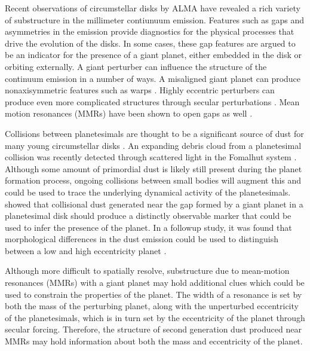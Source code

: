 \documentclass[twocolumn]{aastex63}
\begin{document}
Recent observations of circumstellar disks by ALMA have revealed a rich variety of substructure in the millimeter contiunuum emission. Features 
such as gaps and asymmetries 
\citep{2015ApJ...808L...3A, 2016Sci...353.1519P, PhysRevLett.117.251101, 2016ApJ...820L..40A, 2016Natur.535..258C} in the emission provide 
diagnostics for the physical processes that drive the evolution of the disks. In some cases, these gap features are argued to be an indicator for the 
presence of a giant planet, either embedded in the disk \citep{2015MNRAS.453L..73D} or orbiting externally. A giant perturber can influence the 
structure of the continuum emission in a number of ways. A misaligned giant planet can produce nonaxisymmetric features such as warps 
\citep{2001A&A...370..447A}. Highly eccentric perturbers can produce even more complicated structures through secular perturbations 
\citep{2014MNRAS.443.2541P, 2015MNRAS.448.3679P}. Mean motion resonances (MMRs) have been shown to open gaps as well 
\citep{2015ApJ...798...83N, 2016ApJ...818..159T, 2018ApJ...857....3T}.

Collisions between planetesimals are thought to be a significant source of dust for many young circumstellar disks 
\citep[see][]{2008ARA&A..46..339W}. An expanding debris cloud from a planetesimal collision was recently detected through scattered light in the 
Fomalhut system \citep{2020PNAS..117.9712G}. Although some amount of primordial dust is likely still present during the planet formation process, 
ongoing collisions between small bodies will augment this and could be used to trace the underlying dynamical activity of the planetesimals. 
\citet{2013ApJ...777L..31D} showed that collisional dust generated near the gap formed by a giant planet in a planetesimal disk should produce a 
distinctly observable marker that could be used to infer the presence of the planet. In a followup study, it was found that morphological differences in 
the dust emission could be used to distinguish between a low and high eccentricity planet \citep{2016ApJ...820...29D}.

Although more difficult to spatially resolve, substructure due to mean-motion resonances (MMRs) with a giant planet may hold additional clues which 
could be used to constrain the properties of the planet.  The width of a resonance is set by both the mass of the perturbing planet, along with the 
unperturbed eccentricity of the planetesimals, which is in turn set by the eccentricity of the planet through secular forcing. Therefore, the structure of 
second generation dust produced near MMRs may hold information about both the mass and eccentricity of the planet.
\end{document}
